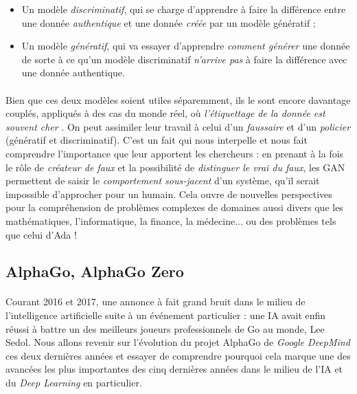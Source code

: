 \begin{itemize}
    \item Un modèle \emph{discriminatif}, qui se charge d'apprendre à faire la différence entre une donnée \emph{authentique}
    et une donnée \emph{créée} par un modèle génératif ;
    \item Un modèle \emph{génératif}, qui va essayer d'apprendre \emph{comment générer} une donnée de sorte à ce 
    qu'un modèle discriminatif \emph{n'arrive pas} à faire la différence avec une donnée authentique.
\end{itemize} 

\paragraph{} Bien que ces deux modèles soient utiles séparemment, ils le sont encore davantage couplés, appliqués à des cas
du monde réel, où \emph{l'étiquettage de la donnée est souvent cher} \cite{MachineLearning5}. On peut assimiler leur travail
à celui d'un \emph{faussaire} et d'un \emph{policier} (génératif et discriminatif). C'est un fait qui nous interpelle et nous fait
comprendre l'importance que leur apportent les chercheurs : en prenant à la fois le rôle de \emph{créateur de faux} et la possibilité de
\emph{distinguer le vrai du faux}, les GAN permettent de saisir le \emph{comportement sous-jacent} d'un système, qu'il serait
impossible d'approcher pour un humain. Cela ouvre de nouvelles perspectives pour la compréhension de problèmes complexes de
domaines aussi divers que les mathématiques, l'informatique, la finance, la médecine... ou des problèmes tels que celui d'Ada !


\subsection*{AlphaGo, AlphaGo Zero}

\paragraph{} Courant 2016 et 2017, une annonce à fait grand bruit dans le milieu de l'intelligence artificielle
suite à un événement particulier : une IA avait enfin réussi à battre un des meilleurs joueurs professionnels de Go
au monde, Lee Sedol. Nous allons revenir sur l'évolution du projet AlphaGo de \emph{Google DeepMind} ces deux dernières
années et essayer de comprendre pourquoi cela marque une des avancées les plus importantes des cinq dernières années
dans le milieu de l'IA et du \emph{Deep Learning} en particulier.

